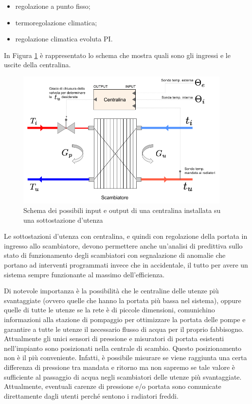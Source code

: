 \documentclass[laurea,oneside,11pt]{USiena_tesiLM}
\begin{document}
\begin{itemize}
\item regolazione a punto fisso;
\item termoregolazione climatica;
\item regolazione climatica evoluta PI.
\end{itemize}  

In Figura \ref{fig:schema_centralina} è  rappresentato lo schema che mostra quali sono gli ingressi e le uscite della centralina.

\begin{figure}[!ht]
\centering
\includegraphics[width=0.95\textwidth]{figure/schema_centralina} 
\caption{Schema dei possibili input e output di una centralina installata su una sottostazione d'utenza}
\label{fig:schema_centralina}
\end{figure}


Le sottostazioni d'utenza con centralina, e quindi con regolazione della portata in ingresso allo scambiatore, devono permettere anche un'analisi di predittiva sullo stato di funzionamento degli scambiatori con segnalazione di anomalie che portano ad interventi programmati invece che in accidentale, il tutto per avere un sistema sempre funzionante al massimo dell'efficienza.

Di notevole importanza è la possibilità che le centraline delle utenze più svantaggiate (ovvero quelle che hanno la portata più bassa nel sistema), oppure quelle di tutte le utenze se la rete è di piccole dimensioni, comunichino informazioni alla stazione di pompaggio per ottimizzare la portata delle pompe e garantire a tutte le utenze il necessario flusso di acqua per il proprio fabbisogno. Attualmente gli unici sensori di pressione e misuratori di portata esistenti nell'impianto sono posizionati nella centrale di scambio. Questo posizionamento non è il più conveniente. Infatti, è possibile misurare se viene raggiunta una certa differenza di pressione tra mandata e ritorno ma non sapremo se tale valore  è sufficiente al passaggio di acqua negli scambiatori delle utenze più svantaggiate. Attualmente, eventuali carenze di pressione e/o portata sono comunicate direttamente dagli utenti perché sentono i radiatori freddi.
\end{document}
